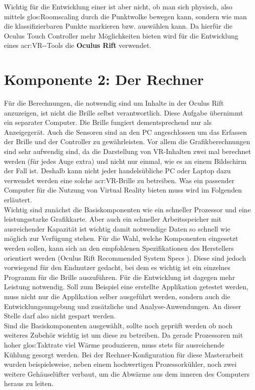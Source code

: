 Wichtig für die Entwicklung einer  ist aber nicht, ob man sich physisch, also mittels \gls{glos:Roomscaling} durch die Punktwolke bewegen kann, sondern wie man die klassifizierbaren Punkte markieren bzw. auswählen kann. Da hierfür die Oculus Touch Controller mehr Möglichkeiten bieten wird für die Entwicklung eines \acrshort{acr:VR}--Tools die \textbf{Oculus Rift} verwendet. 

\section{Komponente 2: Der Rechner}
\label{sec:VR-Rechner}
Für die Berechnungen, die notwendig sind um Inhalte in der Oculus Rift anzuzeigen, ist nicht die Brille selbst verantwortlich. Diese Aufgabe übernimmt ein separater Computer. Die Brille fungiert dementsprechend nur als Anzeigegerät. Auch die Sensoren sind an den PC angeschlossen um das Erfassen der Brille und der Controller zu gewährleisten. Vor allem die Grafikberechnungen sind sehr aufwendig sind, da die Darstellung von VR-Inhalten zwei mal berechnet werden (für jedes Auge extra) und nicht nur einmal, wie es an einem Bildschirm der Fall ist. Deshalb kann nicht jeder handelsübliche PC oder Laptop dazu verwendet werden eine solche \acrshort{acr:VR}-Brille zu betreiben. Was ein passender Computer für die Nutzung von Virtual Reality bieten muss wird im Folgenden erläutert.\\ 

Wichtig sind zunächst die Basiskomponenten wie ein schneller Prozessor und eine leistungsstarke Grafikkarte. Aber auch ein schneller Arbeitsspeicher mit ausreichender Kapazität ist wichtig damit notwendige Daten so schnell wie möglich zur Verfügung stehen. Für die Wahl, welche Komponenten eingesetzt werden sollen, kann sich an den empfohlenen Spezifikationen des Herstellers orientiert werden (Oculus Rift Recommended System Specs \cite{bib:OculusSpecs}). Diese sind jedoch vorwiegend für den Endnutzer gedacht, bei dem es wichtig ist ein einzelnes Programm für die Brille auszuführen. Für die Entwicklung ist dagegen mehr Leistung notwendig. Soll zum Beispiel eine erstellte Applikation getestet werden, muss nicht nur die Applikation selber ausgeführt werden, sondern auch die Entwicklungsumgebung und zusätzliche  und  Analyse-Anwendungen. An dieser Stelle darf also nicht gespart werden.\\

Sind die Basiskomponenten ausgewählt, sollte noch geprüft werden ob noch weiteres Zubehör wichtig ist um diese zu betreiben. Da gerade Prozessoren mit hoher \gls{glos:Taktrate} viel Wärme produzieren, muss stets für ausreichende Kühlung gesorgt werden. Bei der Rechner-Konfiguration für diese Masterarbeit wurden beispielsweise, neben einem hochwertigen Prozessorkühler, noch zwei weitere Gehäuselüfter verbaut, um die Abwärme aus dem inneren des Computers heraus zu leiten. 

